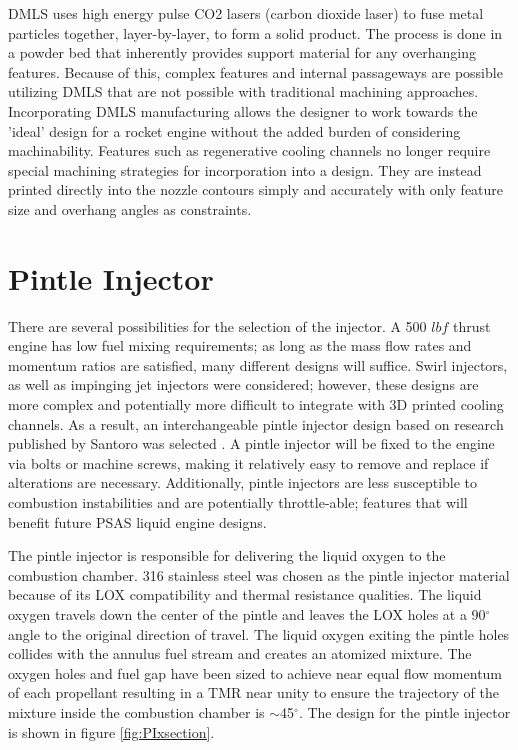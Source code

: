 \documentclass[]{aiaa-tc}%
\begin{document}
DMLS uses high energy pulse CO2 lasers (carbon dioxide laser) to fuse metal particles together, layer-by-layer, to form a solid product. The process is done in a powder bed that inherently provides support material for any overhanging features. Because of this, complex features and internal passageways are possible utilizing DMLS that are not possible with traditional machining approaches. Incorporating DMLS manufacturing allows the designer to work towards the 'ideal' design for a rocket engine without the added burden of considering machinability. Features such as regenerative cooling channels no longer require special machining strategies for incorporation into a design. They are instead printed directly into the nozzle contours simply and accurately with only feature size and overhang angles as constraints. 

\section{Pintle Injector}
\label{sec:PI}


There are several possibilities for the selection of the injector.
A 500 $lbf$ thrust engine has low fuel mixing requirements; as long as the mass flow rates and momentum ratios are satisfied, many different designs will suffice. Swirl injectors, as well as impinging jet injectors were considered; however, these designs are more complex and potentially more difficult to integrate with 3D printed cooling channels. As a result, an interchangeable pintle injector design based on 
research published by Santoro was selected \cite{santoro1999main}. A pintle injector will be fixed to the engine via bolts or machine screws, making it relatively easy to remove and replace if alterations are necessary. Additionally, pintle injectors are less susceptible to combustion instabilities  and are potentially throttle-able; features that will benefit future PSAS liquid engine designs\cite{dressler2000trw}. 


The pintle injector is responsible for delivering the liquid oxygen to the combustion chamber. 316 stainless steel was chosen as the pintle injector material because of its LOX compatibility and thermal resistance qualities. The liquid oxygen travels down the center of the pintle and leaves the LOX holes at a 90$^\circ$ angle to the original direction of travel. The liquid oxygen exiting the pintle holes collides with the annulus fuel stream and creates an atomized mixture. The oxygen holes and fuel gap have been sized to achieve near equal flow momentum of each propellant resulting in a TMR near unity to ensure the trajectory of the mixture inside the combustion chamber is $\sim$45$^\circ$. The design for the pintle injector is shown in figure \ref{fig:PIxsection}.
\end{document}
